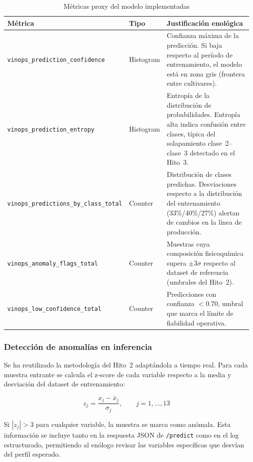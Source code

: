 \begin{table}[htbp]
\centering
\caption{Métricas proxy del modelo implementadas}
\label{tab:metricas-proxy}
\begin{tabular}{@{}llp{6.5cm}@{}}
\toprule
\textbf{Métrica} & \textbf{Tipo} & \textbf{Justificación enológica} \\
\midrule
\texttt{vinops\_prediction\_confidence} & Histogram & Confianza máxima de la predicción. Si baja respecto al período de entrenamiento, el modelo está en zona gris (frontera entre cultivares). \\
\texttt{vinops\_prediction\_entropy} & Histogram & Entropía de la distribución de probabilidades. Entropía alta indica confusión entre clases, típica del solapamiento clase~2--clase~3 detectado en el Hito~3. \\
\texttt{vinops\_predictions\_by\_class\_total} & Counter & Distribución de clases predichas. Desviaciones respecto a la distribución del entrenamiento (33\%/40\%/27\%) alertan de cambios en la línea de producción. \\
\texttt{vinops\_anomaly\_flags\_total} & Counter & Muestras cuya composición fisicoquímica supera $\pm 3\sigma$ respecto al dataset de referencia (umbrales del Hito~2). \\
\texttt{vinops\_low\_confidence\_total} & Counter & Predicciones con confianza $<0.70$, umbral que marca el límite de fiabilidad operativa. \\
\bottomrule
\end{tabular}
\end{table}

\subsubsection{Detección de anomalías en inferencia}

Se ha reutilizado la metodología del Hito~2 adaptándola a tiempo real. Para cada muestra entrante se calcula el z-score de cada variable respecto a la media y desviación del dataset de entrenamiento:

\begin{equation}
    z_j = \frac{x_j - \bar{x}_j}{\sigma_j}, \qquad j = 1,\dots,13
\end{equation}

Si $|z_j| > 3$ para cualquier variable, la muestra se marca como anómala. Esta información se incluye tanto en la respuesta JSON de \texttt{/predict} como en el log estructurado, permitiendo al enólogo revisar las variables específicas que desvían del perfil esperado.

